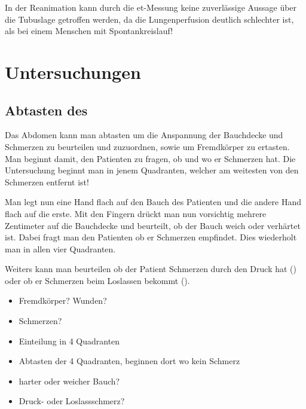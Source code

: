 \begin{Danger}
  \item In der Reanimation kann durch die et-Messung keine zuverlässige Aussage über die Tubuslage getroffen werden, 
  da die Lungenperfusion deutlich schlechter ist, 
  als bei einem Menschen mit Spontankreislauf!
\end{Danger}







\section{ Untersuchungen}

\subsection{Abtasten des }

{\label{topic:untersuchung-abdomen-abtasten}%
%
Das Abdomen kann man abtasten um die Anspannung der
Bauchdecke und Schmerzen zu beurteilen und
zuzuordnen, sowie um Fremdkörper zu ertasten.
Man beginnt damit, den Patienten zu fragen, ob und wo er
Schmerzen hat. Die Untersuchung beginnt man in jenem
Quadranten, welcher am weitesten von den Schmerzen entfernt
ist!

Man legt nun eine Hand flach auf den Bauch des Patienten und
die andere Hand flach auf die erste. Mit den Fingern drückt
man nun vorsichtig mehrere Zentimeter auf die Bauchdecke und
beurteilt, ob der Bauch weich oder verhärtet ist. Dabei
fragt man den Patienten ob er Schmerzen empfindet. Dies
wiederholt man in allen vier Quadranten.

Weiters kann man beurteilen ob der Patient Schmerzen durch
den Druck hat 
() 
oder ob er Schmerzen beim
Loslassen bekommt
().
}
{
\begin{itemize}
  \item Fremdkörper? Wunden?
  \item Schmerzen?
  \item Einteilung in 4 Quadranten
  \item Abtasten der 4 Quadranten, beginnen dort wo kein
  Schmerz
  \item harter oder weicher Bauch?
  \item Druck- oder Loslassschmerz?
\end{itemize}
}{}{}{}


